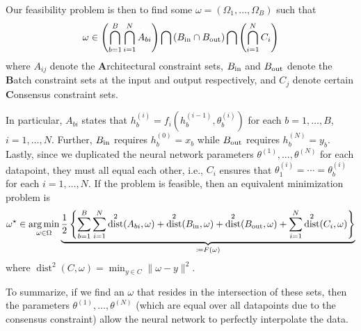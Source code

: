 \documentclass{article}
\DeclareMathOperator*{\argmin}{arg\,min}
\DeclareMathOperator{\dist}{dist}
\theoremstyle{plain}
\theoremstyle{definition}
\theoremstyle{remark}
\begin{document}
Our feasibility problem is then to find some $\omega = (\Omega_1, \ldots, \Omega_B)$
such that
\[
    \omega \in \left(\bigcap_{b=1}^B\bigcap_{i=1}^N A_{bi}\right) \bigcap \left(B_{\rm in} \cap B_{\rm out}\right) \bigcap \left(\bigcap_{i=1}^N C_i\right)
\]
where $A_{ij}$ denote the \textbf{A}rchitectural constraint sets, $B_{\rm in}$ and $B_{\rm out}$ denote the \textbf{B}atch constraint sets at the input and output respectively, and $C_j$ denote certain \textbf{C}onsensus constraint sets.

In particular, $A_{bi}$ states that $h_b^{(i)} = f_i(h_b^{(i-1)}, \theta_b^{(i)})$ for each $b=1,\ldots, B$, $i=1,\ldots, N$. Further, $B_{\rm in}$ requires $h_b^{(0)} = x_b$ while $B_{\rm out}$ requires $h_b^{(N)} = y_b$. Lastly, since we duplicated the neural network parameters $\theta^{(1)}, \ldots, \theta^{(N)}$ for each datapoint, they must all equal each other, i.e., $C_i$ ensures that $\theta_1^{(i)} = \cdots = \theta_b^{(i)}$ for each $i=1,\ldots, N$. If the problem is feasible, then an equivalent minimization problem is
\[
    \omega^\star \in \argmin_{\omega\in\Omega} \underbrace{\frac{1}{2}\left\{\sum_{b=1}^B \sum_{i=1}^N \dist^2(A_{bi}, \omega)   + \dist^2(B_{\rm in}, \omega) + \dist^2(B_{\rm out}, \omega) + \sum_{i=1}^N \dist^2(C_i, \omega)\right\}}_{\coloneqq F(\omega)}
\]
where $\dist^2(C, \omega) = \min_{y\in C} \|\omega - y\|^2$.
\label{sec:feasibility}
\vspace{0.5em}
\begin{tcolorbox}
To summarize, if we find an $\omega$ that resides in the intersection of these sets, then the parameters $\theta^{(1)}, \ldots, \theta^{(N)}$ (which are equal over all datapoints due to the consensus constraint) allow the neural network to perfectly interpolate the data.
\end{tcolorbox}
\vspace{0.5em}
\end{document}
